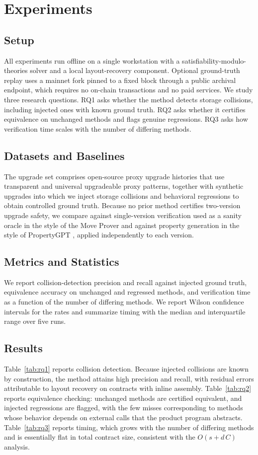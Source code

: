 \documentclass[journal]{IEEEtran}
\begin{document}
\section{Experiments}
\label{sec:exp}

\subsection{Setup}
All experiments run offline on a single workstation with a satisfiability-modulo-theories solver and a local layout-recovery component. Optional ground-truth replay uses a mainnet fork pinned to a fixed block through a public archival endpoint, which requires no on-chain transactions and no paid services. We study three research questions. RQ1 asks whether the method detects storage collisions, including injected ones with known ground truth. RQ2 asks whether it certifies equivalence on unchanged methods and flags genuine regressions. RQ3 asks how verification time scales with the number of differing methods.

\subsection{Datasets and Baselines}
The upgrade set comprises open-source proxy upgrade histories that use transparent and universal upgradeable proxy patterns, together with synthetic upgrades into which we inject storage collisions and behavioral regressions to obtain controlled ground truth. Because no prior method certifies two-version upgrade safety, we compare against single-version verification used as a sanity oracle in the style of the Move Prover \cite{dill2022-move} and against property generation in the style of PropertyGPT \cite{liu2025-propertygpt}, applied independently to each version.

\subsection{Metrics and Statistics}
We report collision-detection precision and recall against injected ground truth, equivalence accuracy on unchanged and regressed methods, and verification time as a function of the number of differing methods. We report Wilson confidence intervals for the rates and summarize timing with the median and interquartile range over five runs.

\subsection{Results}
Table~\ref{tab:rq1} reports collision detection. Because injected collisions are known by construction, the method attains high precision and recall, with residual errors attributable to layout recovery on contracts with inline assembly. Table~\ref{tab:rq2} reports equivalence checking: unchanged methods are certified equivalent, and injected regressions are flagged, with the few misses corresponding to methods whose behavior depends on external calls that the product program abstracts. Table~\ref{tab:rq3} reports timing, which grows with the number of differing methods and is essentially flat in total contract size, consistent with the $O(s + d\,C)$ analysis.
\end{document}
